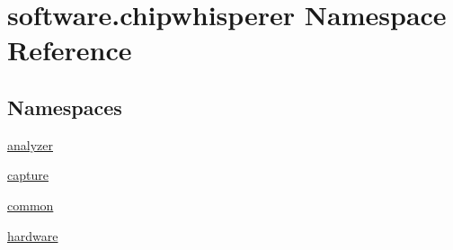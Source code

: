 \hypertarget{namespacesoftware_1_1chipwhisperer}{}\section{software.\+chipwhisperer Namespace Reference}
\label{namespacesoftware_1_1chipwhisperer}
\subsection*{Namespaces}
\begin{DoxyCompactItemize}
\item 
 \hyperlink{namespacesoftware_1_1chipwhisperer_1_1analyzer}{analyzer}
\item 
 \hyperlink{namespacesoftware_1_1chipwhisperer_1_1capture}{capture}
\item 
 \hyperlink{namespacesoftware_1_1chipwhisperer_1_1common}{common}
\item 
 \hyperlink{namespacesoftware_1_1chipwhisperer_1_1hardware}{hardware}
\end{DoxyCompactItemize}

